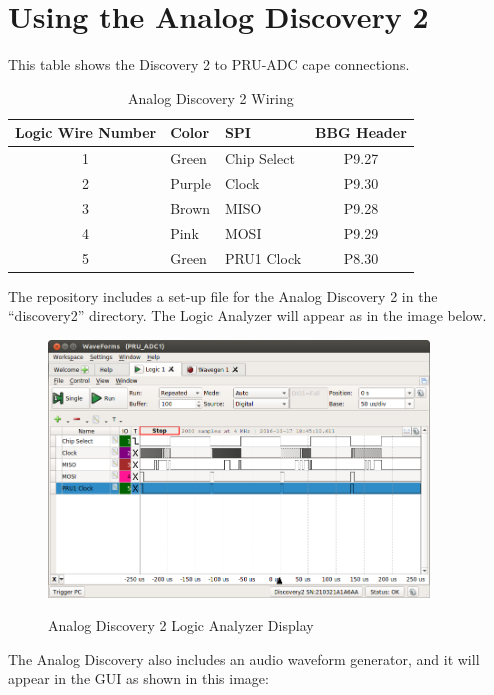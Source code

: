\chapter{Using the Analog Discovery 2}



This table shows the Discovery 2 to PRU-ADC cape connections.


	\begin{longtable}{cllc}
		\caption{Analog Discovery 2 Wiring}\\
		\toprule
Logic Wire Number & Color & SPI & BBG Header \\\midrule
	1	& Green & Chip Select & P9.27 \\ 
	2	& Purple & Clock & P9.30 \\ 
	3	& Brown & MISO & P9.28 \\ 
	4	& Pink &  MOSI & P9.29 \\ 
	5	& Green & PRU1 Clock & P8.30 \\
	\bottomrule
	\end{longtable}
	
	The repository includes a set-up file for the Analog Discovery 2 in the ``discovery2'' directory.  The Logic Analyzer will appear as in the image below.
	
	\begin{figure}[h]
		\centering
		\includegraphics[width=0.9\textwidth]{photos/discovery2_logic}
		\centering\bfseries
		\caption{Analog Discovery 2 Logic Analyzer Display}
	\end{figure}
	
	The Analog Discovery also includes an audio waveform generator, and it will appear in the GUI as shown in this image:
	

